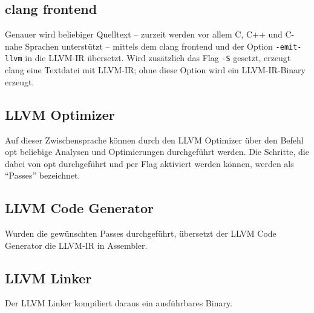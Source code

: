 \subsection{clang frontend}
Genauer wird beliebiger Quelltext -- zurzeit werden vor allem C, C++ und C-nahe Sprachen unterstützt -- mittels dem clang frontend und der Option \texttt{-emit-llvm} in die \ac{LLVM-IR} übersetzt.
Wird zusätzlich das Flag \texttt{-S} gesetzt, erzeugt clang eine Textdatei mit \ac{LLVM-IR}; ohne diese Option wird ein \ac{LLVM-IR}-Binary erzeugt.
\subsection{LLVM Optimizer}\label{subsec:optimizer}
Auf dieser Zwischensprache können durch den \ac{LLVM} Optimizer über den Befehl opt beliebige Analysen und Optimierungen durchgeführt werden.
Die Schritte, die dabei von opt durchgeführt und per Flag aktiviert werden können, werden als \enquote{Passes} bezeichnet.
\subsection{LLVM Code Generator}
Wurden die gewünschten Passes durchgeführt, übersetzt der \ac{LLVM} Code Generator die \ac{LLVM-IR} in Assembler.
\subsection{LLVM Linker}
Der \ac{LLVM} Linker kompiliert daraus ein ausführbares Binary.
